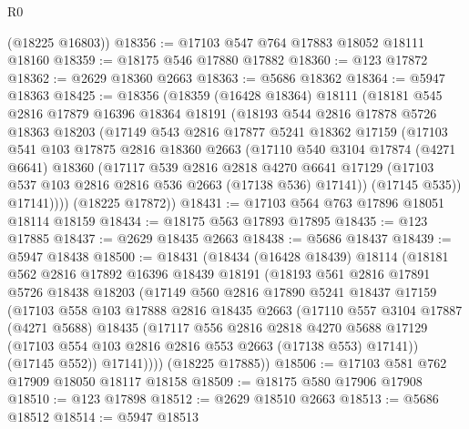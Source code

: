 \begin{lexlean}{R0}
\begin{coremodule}
      (@18225 @16803))
@18356 := @17103 @547 @764 @17883 @18052 @18111 @18160
@18359 := @18175 @546 @17880 @17882
@18360 := @123 @17872
@18362 := @2629 @18360 @2663
@18363 := @5686 @18362
@18364 := @5947 @18363
@18425 := @18356
    (@18359
      (@16428 @18364)
      @18111
      (@18181
        @545
        @2816
        @17879
        @16396
        @18364
        @18191
        (@18193
          @544
          @2816
          @17878
          @5726
          @18363
          @18203
          (@17149
            @543
            @2816
            @17877
            @5241
            @18362
            @17159
            (@17103
              @541
              @103
              @17875
              @2816
              @18360
              @2663
              (@17110
                @540
                @3104
                @17874
                (@4271 @6641)
                @18360
                (@17117
                  @539
                  @2816
                  @2818
                  @4270
                  @6641
                  @17129
                  (@17103 @537 @103 @2816 @2816 @536 @2663 (@17138 @536) @17141))
                (@17145 @535))
              @17141))))
      (@18225 @17872))
@18431 := @17103 @564 @763 @17896 @18051 @18114 @18159
@18434 := @18175 @563 @17893 @17895
@18435 := @123 @17885
@18437 := @2629 @18435 @2663
@18438 := @5686 @18437
@18439 := @5947 @18438
@18500 := @18431
    (@18434
      (@16428 @18439)
      @18114
      (@18181
        @562
        @2816
        @17892
        @16396
        @18439
        @18191
        (@18193
          @561
          @2816
          @17891
          @5726
          @18438
          @18203
          (@17149
            @560
            @2816
            @17890
            @5241
            @18437
            @17159
            (@17103
              @558
              @103
              @17888
              @2816
              @18435
              @2663
              (@17110
                @557
                @3104
                @17887
                (@4271 @5688)
                @18435
                (@17117
                  @556
                  @2816
                  @2818
                  @4270
                  @5688
                  @17129
                  (@17103 @554 @103 @2816 @2816 @553 @2663 (@17138 @553) @17141))
                (@17145 @552))
              @17141))))
      (@18225 @17885))
@18506 := @17103 @581 @762 @17909 @18050 @18117 @18158
@18509 := @18175 @580 @17906 @17908
@18510 := @123 @17898
@18512 := @2629 @18510 @2663
@18513 := @5686 @18512
@18514 := @5947 @18513

\end{coremodule}
\end{lexlean}

